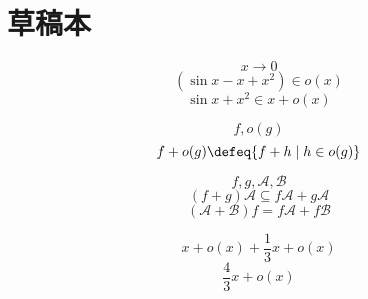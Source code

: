 \section{草稿本}
\[x \rightarrow 0\]
\[(\sin x - x+ x^2) \in o(x)\]
\[\sin x + x^2 \in x + o(x)\]

\Pblock{
    \[F(x) - x \in o(x^2)\]
    \[F(x) \in x + o(x^2) \subseteq x + o(x)\]
    \[F(x) \in x + o(x)\]
}
\[f,o(g)\]
\[f + o(g) \defeq \{f + h \mid h \in o(g)\}\]

\[f,g,\mathcal{A},\mathcal{B}\]\vspace{9pt}
\[(f+g)\mathcal{A} \subseteq f\mathcal{A} + g\mathcal{A}\]
\[(\mathcal{A} + \mathcal{B})f = f\mathcal{A} + f\mathcal{B}\]

\[x + o(x) + \frac{1}{3}x + o(x)\]
\[\frac{4}{3}x + o(x)\]